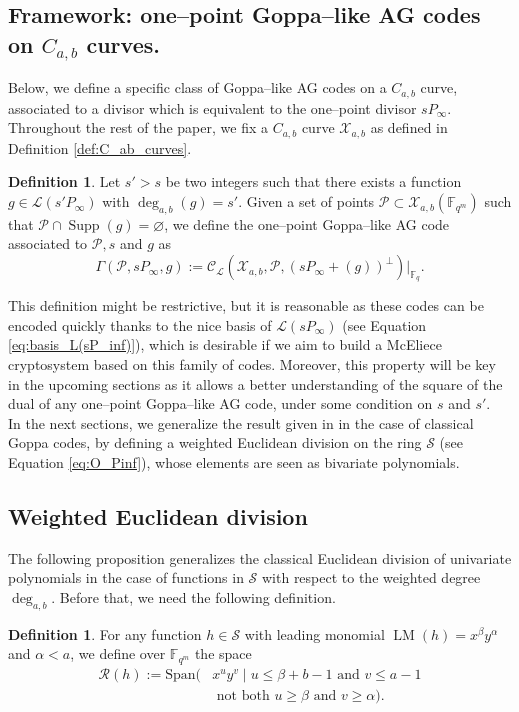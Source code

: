 \documentclass[lettersize,journal]{IEEEtran}
\theoremstyle{plain}
\theoremstyle{definition}
\newtheorem{definition}[thm]{Definition}
\theoremstyle{remark}
\newcommand{\calP}{\mathcal{P}}
\newcommand{\calL}{\mathcal{L}}
\newcommand{\calC}{\mathcal{C}}
\newcommand{\calR}{\mathcal{R}}
\newcommand{\calS}{\mathcal{S}}
\newcommand{\calX}{\mathcal{X}}
\newcommand{\fqm}{\mathbb{F}_{q^m}}
\newcommand{\fq}{\mathbb{F}_{q}}
\newcommand{\F}{\mathbb{F}}
\newcommand{\LM}[1]{\operatorname{LM}\left(#1\right)}
\newcommand{\Supp}{\operatorname{Supp}}
\newcommand{\degab}[1]{\deg_{a,b}\left(#1\right)}
\begin{document}
	\subsection{Framework: one--point Goppa--like AG codes on $C_{a,b}$ curves.}
	
	Below, we define a specific class of Goppa--like AG codes on a $C_{a,b}$ curve, associated to a divisor which is equivalent to the one--point divisor $sP_\infty$. 
	\noindent Throughout the rest of the paper, we fix a $C_{a,b}$ curve $\calX_{a,b}$ as defined in Definition \ref{def:C_ab_curves}.
	\begin{definition} \label{def:one--point_Goppa--like_AG_codes_on_C_a,b_curves}
		Let $s'>s$ be two integers such that there exists a function $g \in \calL(s'P_\infty)$ with $\degab{g}=s'$. Given a set of points  $\calP \subset \calX_{a,b}(\F_{q^m})$ such that $\calP \cap \Supp(g) = \varnothing$, we define the one--point Goppa--like AG code associated to $\calP,s$ and $g$ as 
		\[\Gamma(\calP,sP_\infty,g) := \calC_{\calL}(\calX_{a,b},\calP,(sP_\infty+(g))^{\perp})|_{\fq}.\]
	\end{definition}
	This definition might be restrictive, but it is reasonable as these codes can be encoded quickly thanks to the nice basis of $\calL(sP_\infty)$ (see Equation \eqref{eq:basis_L(sP_inf)}), which is desirable if we aim to build a McEliece cryptosystem based on this family of codes. Moreover, this property will be key in the upcoming sections as it allows a better understanding of the square of the dual of any one--point Goppa--like AG code, under some condition on $s$ and $s'$. \\
	
	\noindent In the next sections, we generalize the result given in \cite{MT21} in the case of classical Goppa codes, by defining a weighted Euclidean division on the ring $\calS$ (see Equation \eqref{eq:O_Pinf}), whose elements are seen as bivariate polynomials. 
	\subsection{Weighted Euclidean division}
	\noindent The following proposition generalizes the classical Euclidean division of univariate polynomials in the case of functions in $\calS$ with respect to the weighted degree $\deg_{a,b}$. Before that, we need the following definition.
	
	\begin{definition} \label{def:remainder_space}
		For any function $h \in \calS$ with leading monomial $\LM{h}=x^\beta y^\alpha$ and $\alpha < a$, we define over $\fqm$ the space
\[\begin{aligned}
		\calR(h) := \text{Span}(&x^u y^v \mid u \leq \beta + b-1 \text{ and } v\leq a-1\\& \text{ not both }  u \geq \beta \text{ and } v \geq \alpha).
\end{aligned}\]


	\end{definition}
	
\end{document}
